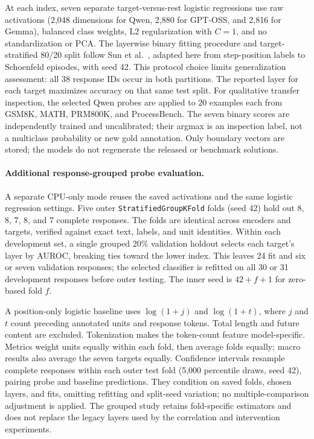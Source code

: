 At each index, seven separate target-versus-rest logistic regressions use raw
activations (2,048 dimensions for Qwen, 2,880 for GPT-OSS, and 2,816 for Gemma), balanced class weights, L2 regularization with
$C=1$, and no standardization or PCA.  The layerwise binary fitting procedure and target-stratified 80/20 split
follow Sun et al.~\cite{sun2026trajectories}, adapted here from step-position
labels to Schoenfeld episodes, with seed 42. This protocol choice limits
generalization assessment: all 38 response IDs occur
in both partitions.  The reported layer for each target maximizes accuracy on
that same test split.  For qualitative transfer inspection, the selected Qwen
probes are applied to 20 examples each from GSM8K, MATH, PRM800K, and
ProcessBench.  The seven binary scores are independently trained and
uncalibrated; their argmax is an inspection label, not a multiclass probability
or new gold annotation.  Only boundary vectors are stored; the models do not
regenerate the released or benchmark solutions.

\paragraph{Additional response-grouped probe evaluation.}
A separate CPU-only mode reuses the saved activations and the same logistic
regression settings. Five outer \texttt{StratifiedGroupKFold} folds (seed 42)
hold out 8, 8, 7, 8, and 7 complete responses. The folds are identical across
encoders and targets, verified against exact text, labels, and unit identities.
Within each development set, a single grouped 20\% validation holdout selects
each target's layer by AUROC, breaking ties toward the lower index. This
leaves 24 fit and six or seven validation responses; the selected classifier
is refitted on all 30 or 31 development responses before outer testing.
The inner seed is $42+f+1$ for zero-based fold $f$.

A position-only logistic baseline uses $\log(1+j)$ and $\log(1+t)$, where $j$
and $t$ count preceding annotated units and response tokens. Total length
and future content are excluded. Tokenization makes the token-count feature
model-specific. Metrics weight units equally within each fold, then average
folds equally; macro results also average the seven targets equally.
Confidence intervals resample complete responses within each outer test
fold (5,000 percentile draws, seed 42), pairing probe and baseline predictions.
They condition on saved folds, chosen layers, and fits, omitting refitting
and split-seed variation; no multiple-comparison adjustment is applied.
The grouped study retains fold-specific estimators and does not replace
the legacy layers used by the correlation and intervention experiments.

